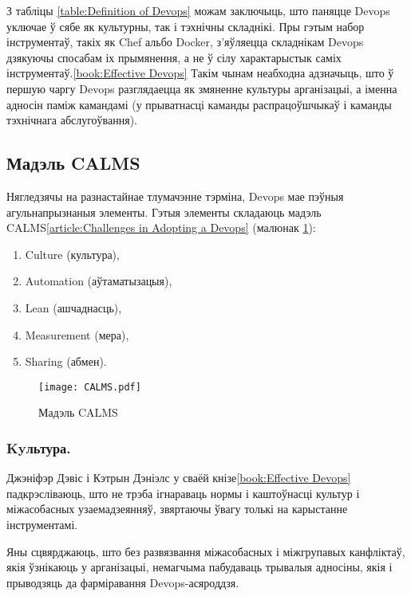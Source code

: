 З табліцы \ref{table:Definition of Devops} можам заключыць,
што паняцце Devops уключае ў сябе як культурны, так і
тэхнічны складнікі.
Пры гэтым набор інструментаў, такіх як Chef альбо Docker,
з'яўляецца складнікам Devops дзякуючы спосабам іх прымянення,
а не ў сілу характарыстык саміх інструментаў.\ref{book:Effective Devops}
Такім чынам неабходна адзначыць, што ў першую чаргу Devops разглядаецца
як змяненне культуры арганізацыі,
а іменна адносін паміж камандамі (у прыватнасці каманды распрацоўшчыкаў і
каманды тэхнічнага абслугоўвання).

\subsection{Мадэль CALMS}

Нягледзячы на разнастайнае тлумачэнне тэрміна, Devops мае
пэўныя агульнапрызнаныя элементы.
Гэтыя элементы складаюць мадэль CALMS\ref{article:Challenges in Adopting a Devops} (малюнак \ref{fig:CALMS model}):
\begin{enumerate}
    \item Culture (культура),
    \item Automation (аўтаматызацыя),
    \item Lean (ашчаднасць),
    \item Measurement (мера),
    \item Sharing (абмен).
\end{enumerate}

\begin{figure}[h!]
    \texttt{[image: CALMS.pdf]}
    \caption{Мадэль CALMS}
    \label{fig:CALMS model}
\end{figure}

\vspace{-\baselineskip}
\subsubsection{Kyльтура.}

Джэніфэр Дэвіс і Кэтрын Дэніэлс у сваёй кнізе\ref{book:Effective Devops}
падкрэсліваюць, што не трэба ігнараваць нормы і каштоўнасці
культур і міжасобасных узаемадзеянняў, звяртаючы ўвагу толькі
на карыстанне інструментамі.

Яны сцвярджаюць, што без развязвання міжасобасных і
міжгрупавых канфліктаў, якія ўзнікаюць у арганізацыі,
немагчыма пабудаваць трывалыя адносіны, якія і прыводзяць
да фарміравання Devops-асяроддзя.

